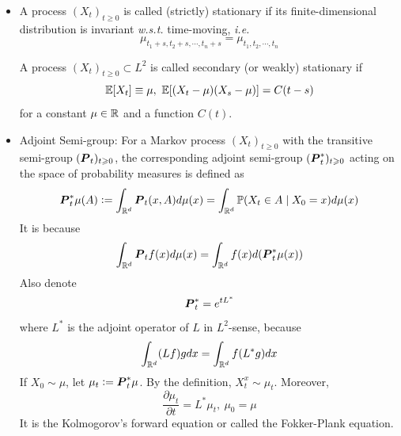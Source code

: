 \documentclass[a4paper,12pt]{article}
\begin{document}
\begin{itemize}
  \item A process $(X_t)_{t\geqslant 0}$ is called (strictly) stationary if its finite-dimensional distribution is invariant \emph{w.s.t.} time-moving, \emph{i.e.}
  \begin{equation*}
    \mu_{t_1+s,t_2+s,\cdots,t_n+s} = \mu_{t_1,t_2,\cdots,t_n}
  \end{equation*}

  \noindent A process $(X_t)_{t\geqslant 0} \subset L^2$ is called secondary (or weakly) stationary if
  \begin{equation*}
    \mathbb{E}[X_t] \equiv \mu,~\mathbb{E}[(X_t-\mu)(X_s-\mu)] = C(t-s)
  \end{equation*}
  for a constant $\mu \in \mathbb{R}$ and a function $C(t)$.

  \item Adjoint Semi-group: For a Markov process $(X_t)_{t \geqslant 0}$ with the transitive semi-group $(\boldsymbol{P}_t)_{t \geqslant 0}$, the corresponding adjoint semi-group $(\boldsymbol{P}^*_t)_{t \geqslant 0}$ acting on the space of probability measures is defined as
  \begin{equation*}
    \boldsymbol{P}_t^*\mu(A) \vcentcolon= \int_{\mathbb{R}^d}\boldsymbol{P}_t(x,A)d\mu(x) = \int_{\mathbb{R}^d}\mathbb{P}(X_t \in A \mid X_0 = x)d\mu(x)
  \end{equation*}
  It is because
  \begin{equation*}
    \int_{\mathbb{R}^d}\boldsymbol{P}_tf(x)d\mu(x) = \int_{\mathbb{R}^d}f(x)d(\boldsymbol{P}_t^*\mu(x))
  \end{equation*}
  Also denote
  \begin{equation*}
    \boldsymbol{P}_t^{*} = e^{tL^*}
  \end{equation*}
  where $L^*$ is the adjoint operator of $L$ in $L^2$-sense, because
  \begin{equation*}
    \int_{\mathbb{R}^d}(Lf)gdx = \int_{\mathbb{R}^d}f(L^*g)dx 
  \end{equation*}
  If $X_0 \sim \mu$, let $\mu_t \vcentcolon= \boldsymbol{P}_t^{*}\mu$. By the definition, $X_t^x \sim \mu_t$. Moreover,
  \begin{equation*}
    \frac{\partial \mu_t}{\partial t} = L^* \mu_t,~\mu_0 = \mu
  \end{equation*}
  It is the Kolmogorov’s forward equation or called the Fokker-Plank equation.


\end{itemize}
\end{document}
